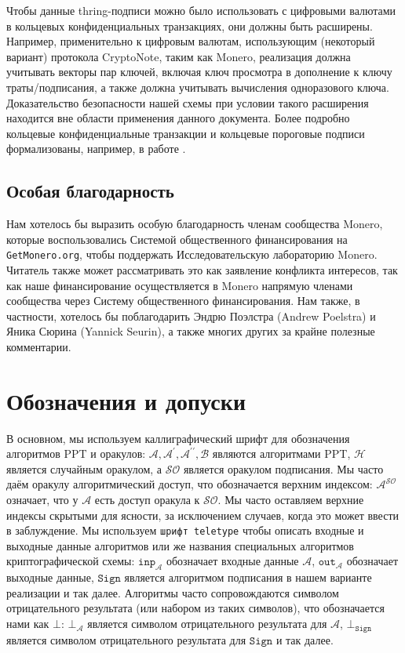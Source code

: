\documentclass{mrl}
\theoremstyle{definition}
\numberwithin{theorem}{subsection}
\newcommand{\adversary}{\mathcal{A}}
\begin{document}
Чтобы данные thring-подписи можно было использовать с цифровыми валютами в кольцевых конфиденциальных транзакциях, они должны быть расширены. Например, применительно к цифровым валютам, использующим (некоторый вариант) протокола CryptoNote, таким как Monero, реализация должна учитывать векторы пар ключей, включая ключ просмотра в дополнение к ключу траты/подписания, а также должна учитывать вычисления одноразового ключа. Доказательство безопасности нашей схемы при условии такого расширения находится вне области применения данного документа. Более подробно кольцевые конфиденциальные транзакции и кольцевые пороговые подписи формализованы, например, в работе \cite{ruffct2}.

\subsection{Особая благодарность}

Нам хотелось бы выразить особую благодарность членам сообщества Monero, которые воспользовались Системой общественного финансирования на \texttt{GetMonero.org}, чтобы поддержать Исследовательскую лабораторию Monero. Читатель также может рассматривать это как заявление конфликта интересов, так как наше финансирование осуществляется в Monero напрямую членами сообщества через Систему общественного финансирования. Нам также, в частности, хотелось бы поблагодарить Эндрю Поэлстра (Andrew Poelstra) и Яника Сюрина (Yannick Seurin), а также многих других за крайне полезные комментарии.

\section{Обозначения и допуски}\label{notation}

В основном, мы используем каллиграфический шрифт для обозначения алгоритмов PPT и оракулов: $\adversary, \adversary^\prime, \adversary^{\prime \prime}, \mathcal{B}$ являются алгоритмами PPT, $\mathcal{H}$ является случайным оракулом, а $\mathcal{SO}$ является оракулом подписания. Мы часто даём оракулу алгоритмический доступ, что обозначается верхним индексом: $\mathcal{A}^{\mathcal{SO}}$ означает, что у $\mathcal{A}$ есть доступ оракула к $\mathcal{SO}$. Мы часто оставляем верхние индексы скрытыми для ясности, за исключением случаев, когда это может ввести в заблуждение. Мы используем \texttt{шрифт teletype} чтобы описать входные и выходные данные алгоритмов или же названия специальных алгоритмов криптографической схемы: $\texttt{inp}_\adversary$ обозначает входные данные $\adversary$, $\texttt{out}_\adversary$ обозначает выходные данные, $\texttt{Sign}$ является алгоритмом подписания в нашем варианте реализации и так далее. Алгоритмы часто сопровождаются символом отрицательного результата (или набором из таких символов), что обозначается нами как $\bot$: $\bot_\adversary$ является символом отрицательного результата для $\adversary$, $\bot_{\texttt{Sign}}$ является символом отрицательного результата для $\texttt{Sign}$ и так далее.
\end{document}
